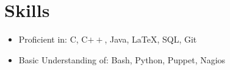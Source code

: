 \documentclass[letterpaper,12pt]{article}
\begin{document}
\section{Skills}
  \begin{itemize}
    \item Proficient in: C, C$++$, Java, \LaTeX, SQL, Git
    \item Basic Understanding of: Bash, Python, Puppet, Nagios
  \end{itemize}

\end{document}
